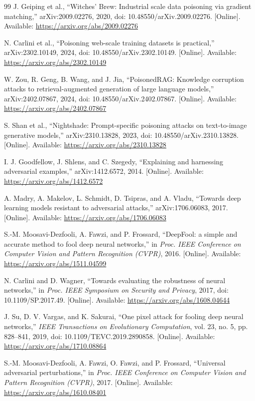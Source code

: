 ﻿\documentclass[6p,10pt,times]{ieeeaccess}
\begin{document}
\begin{thebibliography}{99}
J. Geiping et al., ``Witches' Brew: Industrial scale data poisoning via gradient matching,'' arXiv:2009.02276, 2020, doi: 10.48550/arXiv.2009.02276. [Online]. Available: \url{https://arxiv.org/abs/2009.02276}

N. Carlini et al., ``Poisoning web-scale training datasets is practical,'' arXiv:2302.10149, 2024, doi: 10.48550/arXiv.2302.10149. [Online]. Available: \url{https://arxiv.org/abs/2302.10149}

W. Zou, R. Geng, B. Wang, and J. Jia, ``PoisonedRAG: Knowledge corruption attacks to retrieval-augmented generation of large language models,'' arXiv:2402.07867, 2024, doi: 10.48550/arXiv.2402.07867. [Online]. Available: \url{https://arxiv.org/abs/2402.07867}

S. Shan et al., ``Nightshade: Prompt-specific poisoning attacks on text-to-image generative models,'' arXiv:2310.13828, 2023, doi: 10.48550/arXiv.2310.13828. [Online]. Available: \url{https://arxiv.org/abs/2310.13828}

I. J. Goodfellow, J. Shlens, and C. Szegedy, ``Explaining and harnessing adversarial examples,'' arXiv:1412.6572, 2014. [Online]. Available: \url{https://arxiv.org/abs/1412.6572}

A. Madry, A. Makelov, L. Schmidt, D. Tsipras, and A. Vladu, ``Towards deep learning models resistant to adversarial attacks,'' arXiv:1706.06083, 2017. [Online]. Available: \url{https://arxiv.org/abs/1706.06083}

S.-M. Moosavi-Dezfooli, A. Fawzi, and P. Frossard, ``DeepFool: a simple and accurate method to fool deep neural networks,'' in \emph{Proc. IEEE Conference on Computer Vision and Pattern Recognition (CVPR)}, 2016. [Online]. Available: \url{https://arxiv.org/abs/1511.04599}

N. Carlini and D. Wagner, ``Towards evaluating the robustness of neural networks,'' in \emph{Proc. IEEE Symposium on Security and Privacy}, 2017, doi: 10.1109/SP.2017.49. [Online]. Available: \url{https://arxiv.org/abs/1608.04644}

J. Su, D. V. Vargas, and K. Sakurai, ``One pixel attack for fooling deep neural networks,'' \emph{IEEE Transactions on Evolutionary Computation}, vol. 23, no. 5, pp. 828--841, 2019, doi: 10.1109/TEVC.2019.2890858. [Online]. Available: \url{https://arxiv.org/abs/1710.08864}

S.-M. Moosavi-Dezfooli, A. Fawzi, O. Fawzi, and P. Frossard, ``Universal adversarial perturbations,'' in \emph{Proc. IEEE Conference on Computer Vision and Pattern Recognition (CVPR)}, 2017. [Online]. Available: \url{https://arxiv.org/abs/1610.08401}


\end{thebibliography}
\end{document}

